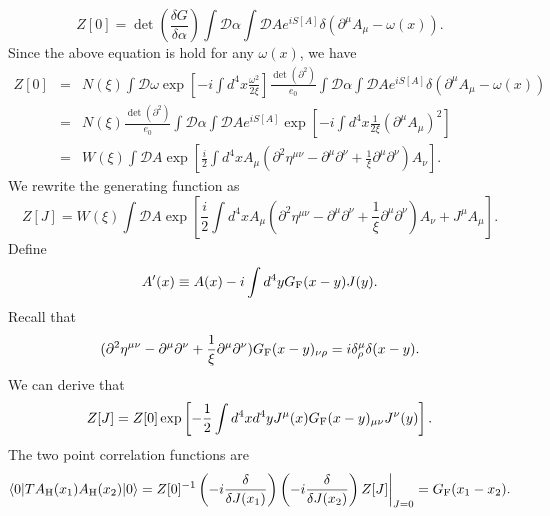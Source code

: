 \[Z[0] = \det \left( \frac{\delta G}{\delta \alpha} \right) \int \mathcal{D}\alpha \int \mathcal{D}A e^{iS[A]} \delta(\partial^{\mu}A_{\mu} - \omega(x)).\]
Since the above equation is hold for any $\omega(x)$, we have
\begin{eqnarray}
Z[0] &=& N(\xi) \int \mathcal{D}\omega \exp\left[ -i \int d^4x \frac{\omega^2}{2\xi} \right] \frac{\det(\partial^2)}{e_0} \int \mathcal{D}\alpha \int \mathcal{D}A e^{iS[A]} \delta(\partial^{\mu}A_{\mu} - \omega(x)) \nonumber \\
&=& N(\xi) \frac{\det(\partial^2)}{e_0} \int \mathcal{D}\alpha \int \mathcal{D}A e^{iS[A]} \exp\left[ -i \int d^4x \frac{1}{2\xi} (\partial^{\mu}A_{\mu})^2\right] \nonumber \\
&=& W(\xi) \int \mathcal{D}A \exp\left[ \frac{i}{2} \int d^4x  A_{\mu} (\partial^2\eta^{\mu\nu} - \partial^{\mu}\partial^{\nu} + \frac{1}{\xi} \partial^{\mu} \partial^{\nu})A_{\nu}\right] .\nonumber
\end{eqnarray}
We rewrite the generating function as
\[Z[J] = W(\xi) \int \mathcal{D}A \exp\left[ \frac{i}{2} \int d^4x  A_{\mu} (\partial^2\eta^{\mu\nu} - \partial^{\mu}\partial^{\nu} + \frac{1}{\xi} \partial^{\mu} \partial^{\nu})A_{\nu} + J^{\mu} A_{\mu}\right].\]
Define
\[A'(x) \equiv A(x) - i \int d^4y G_{\rm F}(x-y)J(y).\]
Recall that
\[(\partial^2\eta^{\mu\nu} - \partial^{\mu}\partial^{\nu} + \frac{1}{\xi} \partial^{\mu} \partial^{\nu})G_{\rm F}(x-y)_{\nu \rho} = i\delta^{\mu}_{\rho}\delta(x-y).\]
We can derive that
\[Z[J]=Z[0] \exp \left[ -\frac{1}{2} \int d^4x d^4y J^{\mu}(x) G_{\rm F}(x-y)_{\mu\nu}J^{\nu}(y) \right].\]
The two point correlation functions are
\[\langle 0 | T A_{\rm H}(x_1) A_{\rm H}(x_2)| 0 \rangle = Z[0]^{-1} \left(-i \frac{\delta}{\delta J(x_1)} \right) \left(-i \frac{\delta}{\delta J(x_2)} \right) Z[J]\bigg|_{J=0} = G_{\rm F}(x_1-x_2) .\]

